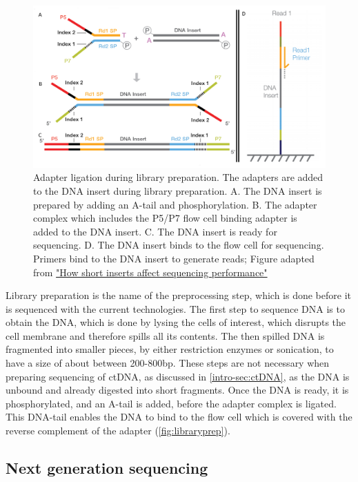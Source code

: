 \begin{figure}[htb]
\centering
\includegraphics[width=.9\linewidth]{Figures/intro/LibraryPreparation.png}
\caption[Library preparation for NGS]{Adapter ligation during library preparation. The adapters are added to the DNA insert during library preparation. A. The DNA insert is prepared by adding an A-tail and phosphorylation. B. The adapter complex which includes the P5/P7 flow cell binding adapter is added to the DNA insert. C. The DNA insert is ready for sequencing. D. The DNA insert binds to the flow cell for sequencing. Primers bind to the DNA insert to generate reads; Figure adapted from \href{https://sapac.support.illumina.com/bulletins/2020/12/how-short-inserts-affect-sequencing-performance.html}{"How short inserts affect sequencing performance"}~\protect\cite{Illumina2020}}\label{fig:libraryprep}
\end{figure}

Library preparation is the name of the preprocessing step, which is done before it is sequenced with the current technologies. The first step to sequence DNA is to obtain the DNA, which is done by lysing the cells of interest, which disrupts the cell membrane and therefore spills all its contents. The then spilled DNA is fragmented into smaller pieces, by either restriction enzymes or sonication, to have a size of about between 200-800bp. These steps are not necessary when preparing  sequencing of ctDNA, as discussed in \autoref{intro-sec:ctDNA}, as the DNA is unbound and already digested into short fragments.
Once the DNA is ready, it is phosphorylated, and an A-tail is added, before the adapter complex is ligated. This DNA-tail enables the DNA to bind to the flow cell which is covered with the reverse complement of the adapter (\autoref{fig:libraryprep}). 

\subsection{Next generation sequencing}
\label{intro-sec:ngs}

